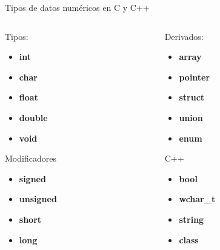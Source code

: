 \documentclass[aspectratio=169]{beamer}
\begin{document}
\begin{frame}[t]{Tipos de datos numéricos en C y C++}
\begin{columns}[c, onlytextwidth]
    \begin{column}{0.5\textwidth}
        Tipos: 
        \begin{itemize}
            \item \textbf{int}
            \item \textbf{char}
            \item \textbf{float}
            \item \textbf{double}
            \item \textbf{void}    
        \end{itemize}
        Modificadores
        \begin{itemize}
            \item \textbf{signed}
            \item \textbf{unsigned}
            \item \textbf{short}
            \item \textbf{long}  
        \end{itemize}
    \end{column}
    \begin{column}{0.5\textwidth}
        Derivados: 
        \begin{itemize}
            \item \textbf{array}
            \item \textbf{pointer}
            \item \textbf{struct}
            \item \textbf{union}
            \item \textbf{enum}    
        \end{itemize}
        C++
        \begin{itemize}
            \item \textbf{bool}
            \item \textbf{wchar\_t}
            \item \textbf{string}
            \item \textbf{class}  
        \end{itemize}
    \end{column}
\end{columns}

\end{frame}


% 
% 

\end{document}
